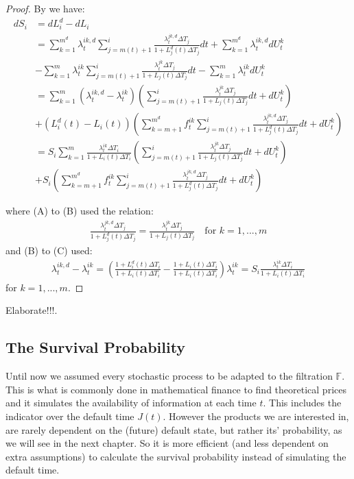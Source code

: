 \documentclass[12pt]{article}
\begin{document}
	\begin{proof}
		By  we have:
		\begin{align*}
			dS_i &= dL^d_i - dL_i\\
			&= \sum_{k=1}^{m^d}\lambda^{i k,d}_t \sum_{j=m(t)+1}^{i}\frac{\lambda^{j k,d}_t \Delta T_j}{1 + L^d_j(t) \Delta T_j} dt + \sum_{k=1}^{m^d}\lambda^{i k,d}_tdU^k_t 
			\tag{A}\\
			&- \sum_{k=1}^{m}\lambda^{i k}_t \sum_{j=m(t)+1}^{i}\frac{\lambda^{j k}_t \Delta T_j}{1 + L_j(t) \Delta T_j} dt - \sum_{k=1}^{m}\lambda^{i k}_t dU^k_t\\
			&= \sum_{k=1}^{m}\left(\lambda^{i k,d}_t - \lambda^{i k}_t\right)\left( \sum_{j=m(t)+1}^{i}\frac{\lambda^{j k}_t \Delta T_j}{1 + L_j(t) \Delta T_j} dt + dU^k_t\right)
			\tag{B}\\
			&+ \left(L^d_i(t) - L_i(t)\right)\left(\sum_{k=m + 1}^{m^d}f^{i k}_t \sum_{j=m(t)+1}^{i}\frac{\lambda^{j k, d}_t \Delta T_j}{1 + L^d_j(t) \Delta T_j} dt + dU^k_t\right)\\
			&= S_i\sum_{k=1}^{m}\frac{\lambda^{i k}_t \Delta T_i}{1 + L_i(t)\Delta T_i}\left( \sum_{j=m(t)+1}^{i}\frac{\lambda^{j k}_t \Delta T_j}{1 + L_j(t) \Delta T_j} dt + dU^k_t\right)
			\tag{C}\\
			&+ S_i\left(\sum_{k=m + 1}^{m^d}f^{i k}_t \sum_{j=m(t)+1}^{i}\frac{\lambda^{j k, d}_t \Delta T_j}{1 + L^d_j(t) \Delta T_j} dt + dU^k_t\right)
		\end{align*}
		
		where (A) to (B) used the relation:
		\begin{align*}
			\frac{\lambda^{j k, d}_t \Delta T_j}{1 + L^d_j(t) \Delta T_j} = \frac{\lambda^{j k}_t \Delta T_j}{1 + L_j(t) \Delta T_j} \quad \text{for } k = 1, ..., m
		\end{align*}
		and (B) to (C) used:
		\begin{align*}
			\lambda^{i k,d}_t - \lambda^{i k}_t = \left(\frac{1 + L^d_i(t) \Delta T_i}{1 + L_i(t)\Delta T_i} - \frac{1 + L_i(t) \Delta T_i}{1 + L_i(t)\Delta T_i}\right)\lambda^{i k}_t = S_i \frac{\lambda^{i k}_t \Delta T_i}{1 + L_i(t) \Delta T_i}
		\end{align*}
		for $k = 1, ..., m$.
	\end{proof}
	
	 \color{red}Elaborate!!!\color{black}. 
	
	
	\subsection{The Survival Probability}
	Until now we assumed every stochastic process to be adapted to the filtration $\mathbb{F}$. This is what is commonly done in mathematical finance to find theoretical prices and it simulates the availability of  information at each time $t$. This includes the indicator over the default time $J(t)$. However the products we are interested in, are rarely dependent on the (future) default state, but rather its' probability, as we will see in the next chapter. So it is more efficient (and less dependent on extra assumptions) to calculate the survival probability instead of simulating the default time.\\
	
\end{document}
